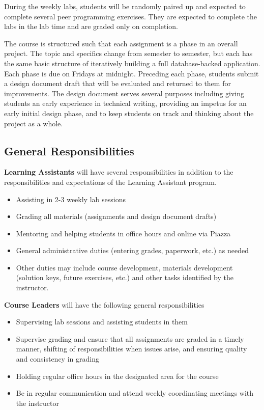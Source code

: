 \documentclass[12pt]{scrartcl}
\begin{document}
During the weekly labs, students will be randomly paired up and 
expected to complete several peer programming exercises.  They are 
expected to complete the labs in the lab time and are graded only on 
completion.

The course is structured such that each assignment is a phase in an
overall project.  The topic and specifics change from semester to 
semester, but each has the same basic structure of iteratively
building a full database-backed application.  Each phase is due on
Fridays at midnight.  Preceding each phase, students submit a
design document draft that will be evaluated and returned to them
for improvements.  The design document serves several purposes including
giving students an early experience in technical writing, providing
an impetus for an early initial design phase, and to keep students 
on track and thinking about the project as a whole.

\subsection*{General Responsibilities}

\textbf{Learning Assistants} will have several responsibilities in 
addition to the responsibilities and expectations of the Learning 
Assistant program.

\begin{itemize}
  \item Assisting in 2-3 weekly lab sessions
  \item Grading all materials (assignments and design document drafts)
  \item Mentoring and helping students in office hours and online via Piazza
  \item General administrative duties (entering grades, paperwork, etc.) as needed
  \item Other duties may include course development, materials development 
  (solution keys, future exercises, etc.) and other tasks identified by the instructor.
\end{itemize}

\textbf{Course Leaders} will have the following general responsibilities
\begin{itemize}
  \item Supervising lab sessions and assisting students in them
  \item Supervise grading and ensure that all assignments are graded 
    in a timely manner, shifting of responsibilities when issues arise, 
    and ensuring quality and consistency in grading
  \item Holding regular office hours in the designated area for the course
  \item Be in regular communication and attend weekly coordinating meetings 
  with the instructor
\end{itemize}
\end{document}
